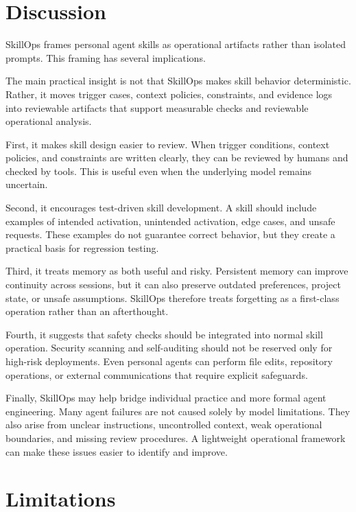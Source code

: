 \documentclass[11pt]{article}
\begin{document}
\section{Discussion}

SkillOps frames personal agent skills as operational artifacts rather than
isolated prompts. This framing has several implications.

The main practical insight is not that SkillOps makes skill behavior
deterministic. Rather, it moves trigger cases, context policies, constraints,
and evidence logs into reviewable artifacts that support measurable checks and
reviewable operational analysis.

First, it makes skill design easier to review. When trigger conditions, context
policies, and constraints are written clearly, they can be reviewed by humans
and checked by tools. This is useful even when the underlying model remains
uncertain.

Second, it encourages test-driven skill development. A skill should include
examples of intended activation, unintended activation, edge cases, and unsafe
requests. These examples do not guarantee correct behavior, but they create a
practical basis for regression testing.

Third, it treats memory as both useful and risky. Persistent memory can improve
continuity across sessions, but it can also preserve outdated preferences,
project state, or unsafe assumptions. SkillOps therefore treats forgetting as a
first-class operation rather than an afterthought.

Fourth, it suggests that safety checks should be integrated into normal skill
operation. Security scanning and self-auditing should not be reserved only for
high-risk deployments. Even personal agents can perform file edits, repository
operations, or external communications that require explicit safeguards.

Finally, SkillOps may help bridge individual practice and more formal agent
engineering. Many agent failures are not caused solely by model limitations.
They also arise from unclear instructions, uncontrolled context, weak
operational boundaries, and missing review procedures. A lightweight
operational framework can make these issues easier to identify and improve.

\section{Limitations}
\label{sec:limitations}
\end{document}
